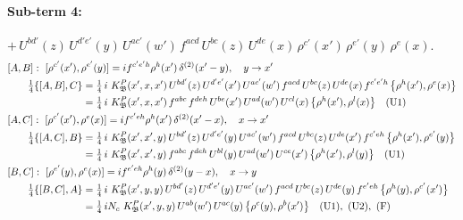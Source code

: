 \documentclass[10pt]{article}
\numberwithin{equation}{section}
\begin{document}
\paragraph{Sub-term 4:} $+\,U^{bd'}(z)\,U^{d'e'}(y)\,U^{ac'}(w')\,f^{acd}\,U^{bc}(z)\,U^{de}(x)\,\rho^{c'}(x')\,\rho^{e'}(y)\,\rho^{e}(x)$.
\begin{align}
&[A,B]:\ [\rho^{c'}(x'),\rho^{e'}(y)]=i f^{c'e'h}\rho^{h}(x')\,\delta^{(2)}(x'-y),\quad y\to x'\notag\\
&\qquad \tfrac14\{[A,B],C\}=\tfrac14\,i\,\,K^{P}_{\mathfrak B}(x',x,x')\,U^{bd'}(z)\,U^{d'e'}(x')\,U^{ac'}(w')\,f^{acd}\,U^{bc}(z)\,U^{de}(x)\,f^{c'e'h}\,\big\{\rho^{h}(x'),\rho^{e}(x)\big\}\notag\\
&\qquad\phantom{\tfrac14\{[A,B],C\}}=\tfrac14\,i\,\,K^{P}_{\mathfrak B}(x',x,x')\,f^{abc}\,f^{deh}\,U^{be}(x')\,U^{ad}(w')\,U^{cl}(x)\,\big\{\rho^{h}(x'),\rho^{l}(x)\big\}\quad\text{(U1)}
\label{eq:GIII.I.P-4-AB}\\
&[A,C]:\ [\rho^{c'}(x'),\rho^{e}(x)]=i f^{c'eh}\rho^{h}(x')\,\delta^{(2)}(x'-x),\quad x\to x'\notag\\
&\qquad \tfrac14\{[A,C],B\}=\tfrac14\,i\,\,K^{P}_{\mathfrak B}(x',x',y)\,U^{bd'}(z)\,U^{d'e'}(y)\,U^{ac'}(w')\,f^{acd}\,U^{bc}(z)\,U^{de}(x')\,f^{c'eh}\,\big\{\rho^{h}(x'),\rho^{e'}(y)\big\}\notag\\
&\qquad\phantom{\tfrac14\{[A,C],B\}}=\tfrac14\,i\,\,K^{P}_{\mathfrak B}(x',x',y)\,f^{abc}\,f^{deh}\,U^{bl}(y)\,U^{ad}(w')\,U^{ce}(x')\,\big\{\rho^{h}(x'),\rho^{l}(y)\big\}\quad\text{(U1)}
\label{eq:GIII.I.P-4-AC}\\
&[B,C]:\ [\rho^{e'}(y),\rho^{e}(x)]=i f^{e'eh}\rho^{h}(y)\,\delta^{(2)}(y-x),\quad x\to y\notag\\
&\qquad \tfrac14\{[B,C],A\}=\tfrac14\,i\,\,K^{P}_{\mathfrak B}(x',y,y)\,U^{bd'}(z)\,U^{d'e'}(y)\,U^{ac'}(w')\,f^{acd}\,U^{bc}(z)\,U^{de}(y)\,f^{e'eh}\,\big\{\rho^{h}(y),\rho^{c'}(x')\big\}\notag\\
&\qquad\phantom{\tfrac14\{[B,C],A\}}=\tfrac14\,i N_{c}\,\,K^{P}_{\mathfrak B}(x',y,y)\,U^{ab}(w')\,U^{ac}(y)\,\big\{\rho^{c}(y),\rho^{b}(x')\big\}\quad\text{(U1)},\ \text{(U2)},\ \text{(F)}
\label{eq:GIII.I.P-4-BC}
\end{align}
\end{document}
